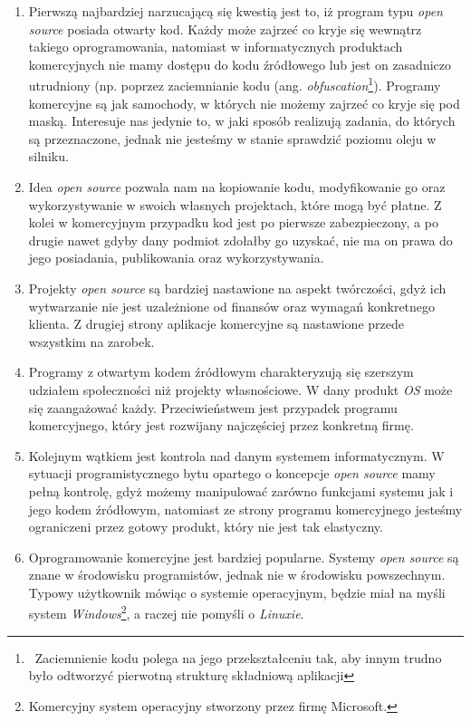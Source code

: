 \documentclass{article}
\begin{document}
\begin{enumerate}
    \item Pierwszą najbardziej narzucającą się kwestią jest to, iż program typu \emph{open source} posiada otwarty kod. Każdy może zajrzeć co kryje się wewnątrz takiego oprogramowania, natomiast w informatycznych produktach komercyjnych nie mamy dostępu do kodu źródłowego lub jest on zasadniczo utrudniony (np. poprzez zaciemnianie kodu (ang. \emph{obfuscation}\footnote{\, Zaciemnienie kodu polega na jego przekształceniu tak, aby innym trudno było odtworzyć pierwotną strukturę składniową aplikacji\cite{Kotula}}). Programy komercyjne są jak samochody, w których nie możemy zajrzeć co kryje się pod maską. Interesuje nas jedynie to, w jaki sposób realizują zadania, do których są przeznaczone, jednak nie jesteśmy w stanie sprawdzić poziomu oleju w silniku.
    
    \item Idea \emph{open source} pozwala nam na kopiowanie kodu, modyfikowanie go oraz wykorzystywanie w swoich własnych projektach, które mogą być płatne. Z kolei w komercyjnym przypadku kod jest po pierwsze zabezpieczony, a po drugie nawet gdyby dany podmiot zdołałby go uzyskać, nie ma on prawa do jego posiadania, publikowania oraz wykorzystywania.
    
    \item Projekty \emph{open source} są bardziej nastawione na aspekt twórczości, gdyż ich wytwarzanie nie jest uzależnione od finansów oraz wymagań konkretnego klienta. Z drugiej strony aplikacje komercyjne są nastawione przede wszystkim na zarobek.
    
    \item Programy z otwartym kodem źródłowym charakteryzują się szerszym udziałem społeczności niż projekty własnościowe. W dany produkt \emph{OS} może się zaangażować każdy. Przeciwieństwem jest przypadek programu komercyjnego, który jest rozwijany najczęściej przez konkretną firmę. 
    
    \item Kolejnym wątkiem jest kontrola nad danym systemem informatycznym. W sytuacji programistycznego bytu opartego o koncepcje \emph{open source} mamy pełną kontrolę, gdyż możemy manipulować zarówno funkcjami systemu jak i jego kodem źródłowym, natomiast ze strony programu komercyjnego jesteśmy ograniczeni przez gotowy produkt, który nie jest tak elastyczny.
    
    \item Oprogramowanie komercyjne jest bardziej popularne. Systemy \emph{open source} są znane w środowisku programistów, jednak nie w środowisku powszechnym. Typowy użytkownik mówiąc o systemie operacyjnym, będzie miał na myśli system \emph{Windows}\footnote{Komercyjny system operacyjny stworzony przez firmę Microsoft.}, a raczej nie pomyśli o \emph{Linuxie}.
    

\end{enumerate}
\end{document}
